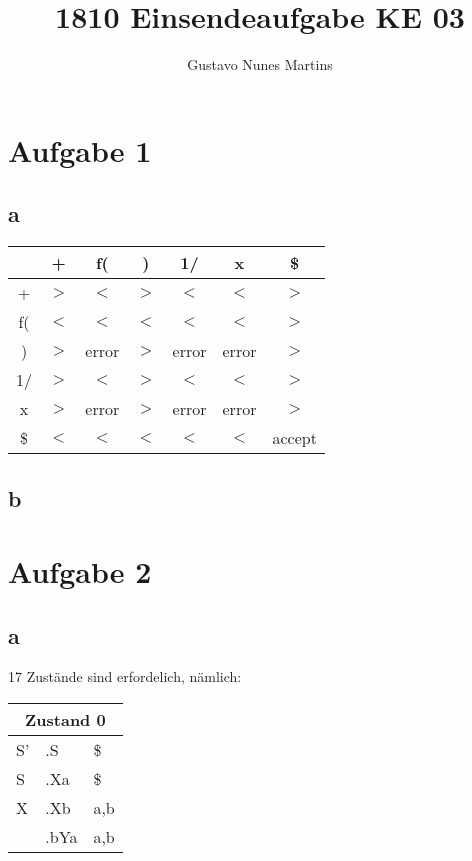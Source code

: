 \documentclass[11pt]{scrartcl}
\title{\textbf{1810 Einsendeaufgabe KE 03}}
\author{Gustavo Nunes Martins}
\begin{document}
	\maketitle
	\section*{Aufgabe 1}
	\subsection*{a}
	\begin{tabular}{c|c|c|c|c|c|c}
		  &+&f(&)&1/&x&\$ \\ \hline
		+ & $>$ & $<$ & $>$ & $<$ & $<$ & $>$ \\ \hline
		f(& $<$ & $<$ & $<$ & $<$ & $<$ & $>$  \\ \hline
		) & $>$ & error & $>$ & error & error & $>$  \\ \hline
		1/& $>$ & $<$ & $>$ & $<$ & $<$ & $>$  \\ \hline
		x & $>$ & error & $>$ & error & error & $>$  \\ \hline
		\$& $<$ & $<$ & $<$ & $<$ & $<$ & accept 
	\end{tabular}
	\subsection*{b}
	\section*{Aufgabe 2}
	\subsection*{a}
	17 Zustände sind erfordelich, nämlich:


	\begin{tabular}{l|l|l}
		\multicolumn{3}{c}{Zustand 0} \\ \hline
		S' & .S & \$ \\ \hline
		S & .Xa & \$ \\ \hline
		X & .Xb & a,b \\
		& .bYa & a,b \\
	\end{tabular}
	
\end{document}
